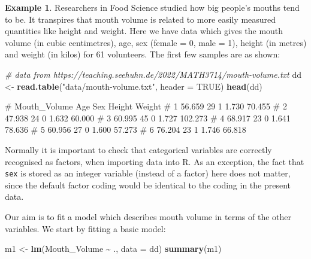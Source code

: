 \documentclass[
  a4paper,
]{article}
\newenvironment{Shaded}{\begin{snugshade}}{\end{snugshade}}
\newcommand{\AttributeTok}[1]{\textcolor[rgb]{0.13,0.29,0.53}{#1}}
\newcommand{\CommentTok}[1]{\textcolor[rgb]{0.56,0.35,0.01}{\textit{#1}}}
\newcommand{\ConstantTok}[1]{\textcolor[rgb]{0.56,0.35,0.01}{#1}}
\newcommand{\FunctionTok}[1]{\textcolor[rgb]{0.13,0.29,0.53}{\textbf{#1}}}
\newcommand{\NormalTok}[1]{#1}
\newcommand{\OtherTok}[1]{\textcolor[rgb]{0.56,0.35,0.01}{#1}}
\newcommand{\SpecialCharTok}[1]{\textcolor[rgb]{0.81,0.36,0.00}{\textbf{#1}}}
\newcommand{\StringTok}[1]{\textcolor[rgb]{0.31,0.60,0.02}{#1}}
\theoremstyle{definition}
\theoremstyle{definition}
\newtheorem{example}{Example}[section]
\theoremstyle{definition}
\theoremstyle{definition}
\theoremstyle{remark}
\begin{document}
\begin{example}
Researchers in Food Science studied how big people's mouths tend to be.
It transpires that mouth volume is related to more easily measured quantities
like height and weight. Here we have data which gives
the mouth volume (in cubic centimetres), age, sex (female = 0, male = 1),
height (in metres) and weight (in kilos) for 61 volunteers.
The first few samples are as shown:

\begin{Shaded}
\begin{Highlighting}[]
\CommentTok{\# data from https://teaching.seehuhn.de/2022/MATH3714/mouth{-}volume.txt}
\NormalTok{dd }\OtherTok{\textless{}{-}} \FunctionTok{read.table}\NormalTok{(}\StringTok{"data/mouth{-}volume.txt"}\NormalTok{, }\AttributeTok{header =} \ConstantTok{TRUE}\NormalTok{)}
\FunctionTok{head}\NormalTok{(dd)}
\end{Highlighting}
\end{Shaded}

\begin{Shaded}
\begin{Highlighting}[]
\NormalTok{\#   Mouth\_Volume Age Sex Height  Weight}
\NormalTok{\# 1       56.659  29   1  1.730  70.455}
\NormalTok{\# 2       47.938  24   0  1.632  60.000}
\NormalTok{\# 3       60.995  45   0  1.727 102.273}
\NormalTok{\# 4       68.917  23   0  1.641  78.636}
\NormalTok{\# 5       60.956  27   0  1.600  57.273}
\NormalTok{\# 6       76.204  23   1  1.746  66.818}
\end{Highlighting}
\end{Shaded}

Normally it is important to check that categorical variables are correctly
recognised as factors, when importing data into R. As an exception,
the fact that \texttt{sex} is stored as an integer variable (instead of a factor)
here does not matter, since the default factor coding would be identical
to the coding in the present data.

Our aim is to fit a model which describes mouth volume in terms of the
other variables. We start by fitting a basic model:

\begin{Shaded}
\begin{Highlighting}[]
\NormalTok{m1 }\OtherTok{\textless{}{-}} \FunctionTok{lm}\NormalTok{(Mouth\_Volume }\SpecialCharTok{\textasciitilde{}}\NormalTok{ ., }\AttributeTok{data =}\NormalTok{ dd)}
\FunctionTok{summary}\NormalTok{(m1)}
\end{Highlighting}
\end{Shaded}


\end{example}
\end{document}
